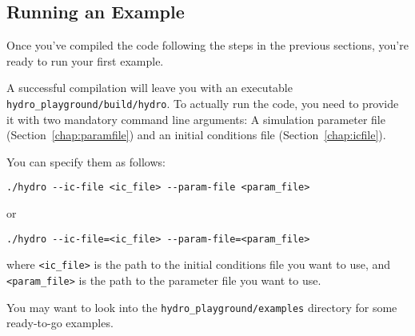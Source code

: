 \subsection{Running an Example}


Once you've compiled the code following the steps in the previous sections,
you're ready to run your first example.

A successful compilation will leave you with an executable
\verb|hydro_playground/build/hydro|. To actually run the code, you need to
provide it with two mandatory command line arguments: A simulation parameter
file (Section~\ref{chap:paramfile}) and an initial conditions file
(Section~\ref{chap:icfile}).

You can specify them as follows:

\begin{lstlisting}
./hydro --ic-file <ic_file> --param-file <param_file>
\end{lstlisting}

or

\begin{lstlisting}
./hydro --ic-file=<ic_file> --param-file=<param_file>
\end{lstlisting}

where \verb|<ic_file>| is the path to the initial conditions file you want to
use, and \verb|<param_file>| is the path to the parameter file you want to use.

You may want to look into the \verb|hydro_playground/examples| directory for
some ready-to-go examples.



